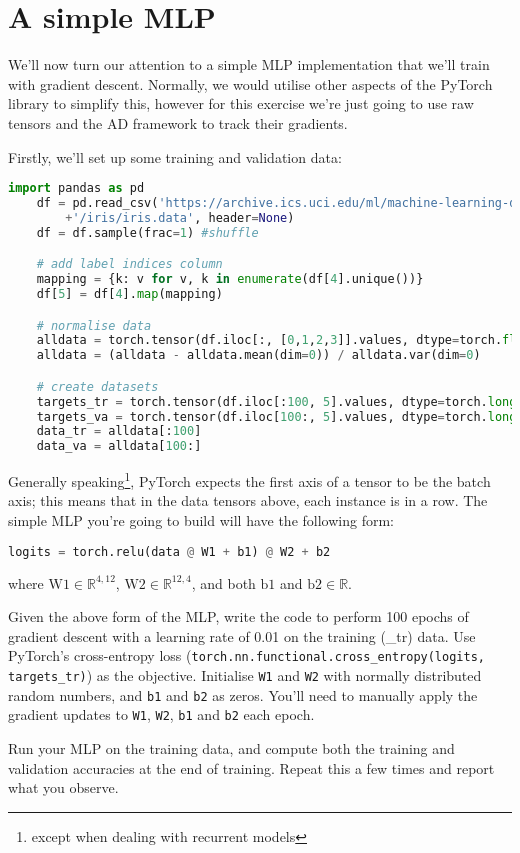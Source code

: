 \documentclass[a4paper]{article}
\begin{document}
\section{A simple MLP}\label{mlp}
We'll now turn our attention to a simple MLP implementation that we'll train with gradient descent. Normally, we would utilise other aspects of the PyTorch library to simplify this, however for this exercise we're just going to use raw tensors and the AD framework to track their gradients.

Firstly, we'll set up some training and validation data:
\begin{lstlisting}[language=Python]
	import pandas as pd
	df = pd.read_csv('https://archive.ics.uci.edu/ml/machine-learning-databases'
		+'/iris/iris.data', header=None)
	df = df.sample(frac=1) #shuffle

	# add label indices column
	mapping = {k: v for v, k in enumerate(df[4].unique())}  
	df[5] = df[4].map(mapping)

	# normalise data
	alldata = torch.tensor(df.iloc[:, [0,1,2,3]].values, dtype=torch.float)
	alldata = (alldata - alldata.mean(dim=0)) / alldata.var(dim=0)

	# create datasets
	targets_tr = torch.tensor(df.iloc[:100, 5].values, dtype=torch.long)
	targets_va = torch.tensor(df.iloc[100:, 5].values, dtype=torch.long)
	data_tr = alldata[:100]
	data_va = alldata[100:]
\end{lstlisting}

Generally speaking\footnote{except when dealing with recurrent models}, PyTorch expects the first axis of a tensor to be the batch axis; this means that in the data tensors above, each instance is in a row. The simple MLP you're going to build will have the following form:

\begin{lstlisting}[language=Python]
	logits = torch.relu(data @ W1 + b1) @ W2 + b2
\end{lstlisting}

where $\mathrm{W1} \in \mathbb{R}^{4,12}$, $\mathrm{W2} \in \mathbb{R}^{12,4}$, and both $\mathrm{b1}$ and $\mathrm{b2} \in \mathbb{R}$. 

\begin{tcolorbox}[title=2.1 Implement the MLP (1 mark)]
Given the above form of the MLP, write the code to perform 100 epochs of gradient descent with a learning rate of 0.01 on the training (\_tr) data. Use PyTorch's cross-entropy loss (\texttt{torch.nn.functional.cross\_entropy(logits, targets\_tr)}) as the objective. Initialise \texttt{W1} and \texttt{W2} with normally distributed random numbers, and \texttt{b1} and \texttt{b2} as zeros. You'll need to manually apply the gradient updates to \texttt{W1}, \texttt{W2}, \texttt{b1} and \texttt{b2} each epoch.
\end{tcolorbox}

\begin{tcolorbox}[title=2.2 Test the MLP (1 mark)]
Run your MLP on the training data, and compute both the training and validation accuracies at the end of training. Repeat this a few times and report what you observe. 
\end{tcolorbox}
\end{document}
